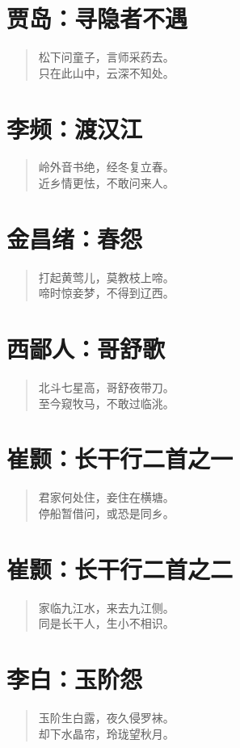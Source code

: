\documentclass[12pt,oneside]{book}
\newenvironment{shici}{%
\begin{verse}\centering\yanti\large\hspace{12pt}}{\end{verse}}
\begin{document}
\begin{common-format}
\chapter{贾岛：寻隐者不遇}
\begin{shici}
松下问童子，言师采药去。\\
只在此山中，云深不知处。
\end{shici}

\chapter{李频：渡汉江}
\begin{shici}
岭外音书绝，经冬复立春。\\
近乡情更怯，不敢问来人。
\end{shici}

\chapter{金昌绪：春怨}
\begin{shici}
打起黄莺儿，莫教枝上啼。\\
啼时惊妾梦，不得到辽西。
\end{shici}

\chapter{西鄙人：哥舒歌}
\begin{shici}
北斗七星高，哥舒夜带刀。\\
至今窥牧马，不敢过临洮。
\end{shici}

\chapter{崔颢：长干行二首之一}
\begin{shici}
君家何处住，妾住在横塘。\\
停船暂借问，或恐是同乡。
\end{shici}

\chapter{崔颢：长干行二首之二}
\begin{shici}
家临九江水，来去九江侧。\\
同是长干人，生小不相识。
\end{shici}

\chapter{李白：玉阶怨}
\begin{shici}
玉阶生白露，夜久侵罗袜。\\
却下水晶帘，玲珑望秋月。
\end{shici}


\end{common-format}
\end{document}
